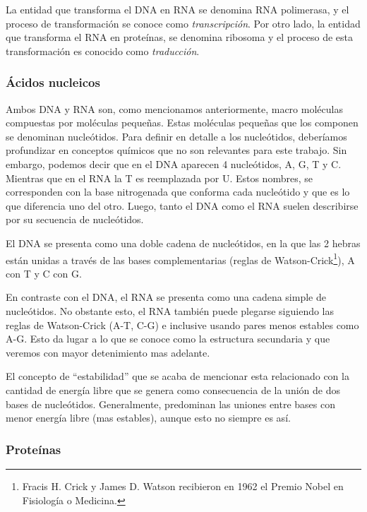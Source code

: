 La entidad que transforma el \ac{DNA} en \ac{RNA} se denomina \ac{RNA}
polimerasa, y el proceso de transformaci\'on se conoce como
\textit{transcripci\'on}. Por otro lado, la entidad que transforma el
\ac{RNA} en prote\'inas, se denomina ribosoma y el proceso de esta
transformaci\'on es conocido como \textit{traducci\'on}.

\subsubsection{\'Acidos nucleicos}

Ambos \ac{DNA} y \ac{RNA} son, como mencionamos anteriormente, macro mol\'eculas
compuestas por mol\'eculas peque\~nas. Estas mol\'eculas peque\~nas que los
componen se denominan nucle\'otidos. Para definir en detalle a los
nucle\'otidos, deber\'iamos profundizar en conceptos qu\'imicos que no son
relevantes para este trabajo. Sin embargo, podemos decir que en el \ac{DNA}
aparecen 4 nucle\'otidos, \ac{A}, \ac{G}, \ac{T} y \ac{C}. Mientras que en el
\ac{RNA} la \ac{T} es reemplazada por \ac{U}. Estos nombres, se corresponden
con la base nitrogenada que conforma cada nucle\'otido y que es lo que
diferencia uno del otro. Luego, tanto el \ac{DNA} como el \ac{RNA} suelen
describirse por su secuencia de nucle\'otidos.

El \ac{DNA} se presenta como una doble cadena de nucle\'otidos, en la que las 2
hebras est\'an unidas a trav\'es de las bases complementarias (reglas de
Watson-Crick\footnote{Fracis H. Crick y James D. Watson recibieron en 1962 el
Premio Nobel en Fisiolog\'ia o Medicina.}), \ac{A} con \ac{T} y \ac{C} con
\ac{G}.

En contraste con el \ac{DNA}, el \ac{RNA} se presenta como una cadena simple de
nucle\'otidos. No obstante esto, el \ac{RNA} tambi\'en puede plegarse siguiendo
las reglas de Watson-Crick (\ac{A}-\ac{T}, \ac{C}-\ac{G}) e inclusive usando
pares menos estables como \ac{A}-\ac{G}. Esto da lugar a lo que se conoce
como la estructura secundaria y que veremos con mayor detenimiento mas adelante.

El concepto de ``estabilidad'' que se acaba de mencionar esta relacionado con
la cantidad de energ\'ia libre que se genera como consecuencia de la uni\'on de
dos bases de nucle\'otidos. Generalmente, predominan las uniones entre bases con
menor energ\'ia libre (mas estables), aunque esto no siempre es as\'i.

\subsubsection{Prote\'inas}

